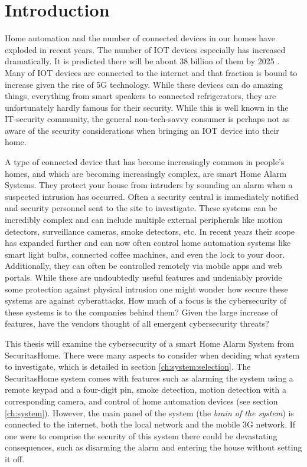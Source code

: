 \chapter{Introduction} \label{ch:intro}
Home automation and the number of connected devices in our homes have exploded in recent years. The number of \gls{IOT} devices especially has increased dramatically. It is predicted there will be about 38 billion of them by 2025 \cite{ieee-iot}. Many of \gls{IOT} devices are connected to the internet and that fraction is bound to increase given the rise of 5G technology. While these devices can do amazing things, everything from smart speakers to connected refrigerators, they are unfortunately hardly famous for their security. While this is well known in the IT-security community, the general non-tech-savvy consumer is perhaps not as aware of the security considerations when bringing an \gls{IOT} device into their home.

A type of connected device that has become increasingly common in people's homes, and which are becoming increasingly complex, are smart Home Alarm Systems. They protect your house from intruders by sounding an alarm when a suspected intrusion has occurred. Often a security central is immediately notified and security personnel sent to the site to investigate. These systems can be incredibly complex and can include multiple external peripherals like motion detectors, surveillance cameras, smoke detectors, etc. In recent years their scope has expanded further and can now often control home automation systems like smart light bulbs, connected coffee machines, and even the lock to your door. Additionally, they can often be controlled remotely via mobile apps and web portals. While these are undoubtedly useful features and undeniably provide some protection against physical intrusion one might wonder how secure these systems are against cyberattacks. How much of a focus is the cybersecurity of these systems is to the companies behind them? Given the large increase of features, have the vendors thought of all emergent cybersecurity threats?

This thesis will examine the cybersecurity of a smart Home Alarm System from SecuritasHome. There were many aspects to consider when deciding what system to investigate, which is detailed in section \ref{ch:system:selection}. The SecuritasHome system comes with features such as alarming the system using a remote keypad and a four-digit pin, smoke detection, motion detection with a corresponding camera, and control of home automation devices (see section \ref{ch:system}). However, the main panel of the system (the \textit{brain of the system}) is connected to the internet, both the local network and the mobile 3G network. If one were to comprise the security of this system there could be devastating consequences, such as disarming the alarm and entering the house without setting it off.

